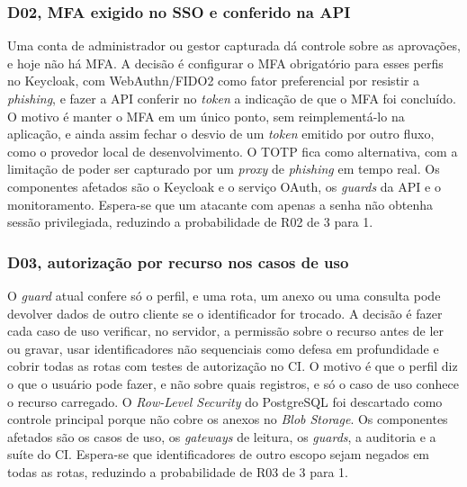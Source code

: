 \documentclass[conference]{IEEEtran}
\begin{document}
\subsubsection{D02, MFA exigido no SSO e conferido na API}
Uma conta de administrador ou gestor capturada dá controle sobre as aprovações, e hoje não há MFA. A decisão é configurar o MFA obrigatório para esses perfis no Keycloak, com WebAuthn/FIDO2 como fator preferencial por resistir a \textit{phishing}, e fazer a API conferir no \textit{token} a indicação de que o MFA foi concluído. O motivo é manter o MFA em um único ponto, sem reimplementá-lo na aplicação, e ainda assim fechar o desvio de um \textit{token} emitido por outro fluxo, como o provedor local de desenvolvimento. O TOTP fica como alternativa, com a limitação de poder ser capturado por um \textit{proxy} de \textit{phishing} em tempo real. Os componentes afetados são o Keycloak e o serviço OAuth, os \textit{guards} da API e o monitoramento. Espera-se que um atacante com apenas a senha não obtenha sessão privilegiada, reduzindo a probabilidade de R02 de 3 para 1.

\subsubsection{D03, autorização por recurso nos casos de uso}
O \textit{guard} atual confere só o perfil, e uma rota, um anexo ou uma consulta pode devolver dados de outro cliente se o identificador for trocado. A decisão é fazer cada caso de uso verificar, no servidor, a permissão sobre o recurso antes de ler ou gravar, usar identificadores não sequenciais como defesa em profundidade e cobrir todas as rotas com testes de autorização no CI. O motivo é que o perfil diz o que o usuário pode fazer, e não sobre quais registros, e só o caso de uso conhece o recurso carregado. O \textit{Row-Level Security} do PostgreSQL foi descartado como controle principal porque não cobre os anexos no \textit{Blob Storage}. Os componentes afetados são os casos de uso, os \textit{gateways} de leitura, os \textit{guards}, a auditoria e a suíte do CI. Espera-se que identificadores de outro escopo sejam negados em todas as rotas, reduzindo a probabilidade de R03 de 3 para 1.
\end{document}
